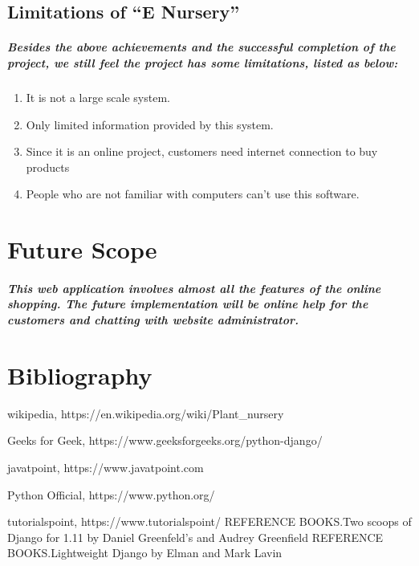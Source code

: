 \documentclass[12pt]{report}
\begin{document}
        \section{Limitations of  “E Nursery”}
        \paragraph
        {
        Besides the above achievements and the successful completion of the project, we still feel the project has some limitations, listed as below:
        }
        
        \begin{enumerate}
            \item It is not a large scale system. 
            \item Only limited information provided by this system. 
            \item Since it is an online project, customers need internet connection to buy products
            \item People who are not familiar with computers can’t use this software.
        \end{enumerate}
    \chapter{Future Scope}
    \paragraph
    {
    This web application involves almost all the features of the online shopping. The future implementation will be online help for the customers and chatting with website administrator.
    }
    
    \chapter{Bibliography}
    
    \begin{thebibliography}{20}

       wikipedia, https://en.wikipedia.org/wiki/Plant\_nursery
    
       Geeks for Geek, https://www.geeksforgeeks.org/python-django/
    
       javatpoint, https://www.javatpoint.com
    
       Python Official, https://www.python.org/
    
    tutorialspoint,  https://www.tutorialspoint/
      REFERENCE BOOKS.Two scoops of Django for 1.11 by Daniel Greenfeld’s and Audrey Greenfield
       REFERENCE BOOKS.Lightweight Django by Elman and Mark Lavin
      \end{thebibliography}
    
\end{document}
